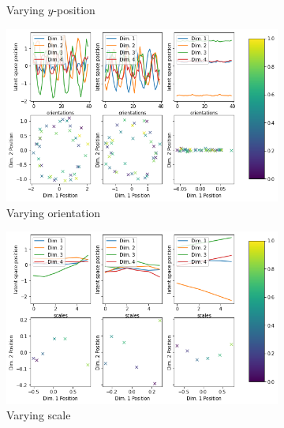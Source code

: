 \begin{figure}
\begin{subfigure}{.48\textwidth}
        \caption{Varying $y$-position}
        \label{subfig:vlae_dsprites_latent_space_values_y}
    \end{subfigure}
    \vfill
    \begin{subfigure}{.48\textwidth}
        \centering
        \includegraphics[width=\textwidth]{images/latent_space_traversals/vlae_dsprites_orientation_latent_space_values.png}
        \caption{Varying orientation}
        \label{subfig:vlae_dsprites_latent_space_values_orientation}
    \end{subfigure}
    \hfill
    \begin{subfigure}{.48\textwidth}
        \centering
        \includegraphics[width=\textwidth]{images/latent_space_traversals/vlae_dsprites_scale_latent_space_values.png}
        \caption{Varying scale}
        \label{subfig:vlae_dsprites_latent_space_values_scale}
    \end{subfigure}
    \vfill
    \begin{subfigure}{.48\textwidth}

\end{subfigure}
\end{figure}

